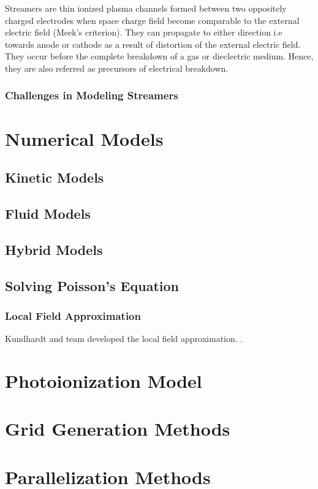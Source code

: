 Streamers are thin ionized plasma channels formed between two oppositely charged electrodes when space charge field become comparable to the external electric field (Meek's criterion). They can propagate to either direction i.e towards anode or cathode as a result of distortion of the external electric field. They occur before the complete breakdown of a gas or dieclectric medium. Hence, they are also referred as precursors of electrical breakdown.  

\subsection{Challenges in Modeling Streamers}




\chapter{Numerical Models}

\section{Kinetic Models}

\section{Fluid Models}

\section{Hybrid Models}

\section{Solving Poisson's Equation}

\subsection{Local Field Approximation}

Kundhardt and team developed the local field approximation. \cite{Kunhardt et al 1988}.





\chapter{Photoionization Model}



\chapter{Grid Generation Methods}

\chapter{Parallelization Methods}

